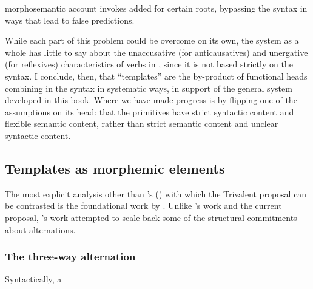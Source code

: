 \begin{exe}
\begin{xlist}
\begin{xlist}
\begin{exe}
\begin{xlist}
\begin{xlist}
\begin{exe}
\begin{xlist}
\begin{xlist}
\begin{exe}
\begin{exe}
\begin{xlist}
\begin{exe}
\begin{exe}
\begin{xlist}
\begin{exe}
\begin{exe}
\begin{exe}
\begin{exe}
\begin{exe}
\begin{xlist}
\begin{exe}
\begin{xlist}
\begin{exe}
\begin{exe}
\begin{xlist}
\begin{exe}
\begin{xlist}
\begin{exe}
\begin{xlist}
\begin{exe}
\begin{exe}
\begin{exe}
\begin{xlist}
\begin{exe}
\begin{exe}
\begin{exe}
\begin{xlist}
\begin{exe}
\begin{xlist}
\begin{exe}
\begin{xlist}
\begin{exe}
\begin{xlist}
\begin{exe}
\begin{exe}
\begin{exe}
\begin{exe}
\begin{xlist}
\begin{exe}
\begin{xlist}
\begin{exe}
\begin{xlist}
\begin{exe}
\begin{xlist}
\begin{exe}
\begin{xlist}
\begin{exe}
\begin{xlist}
\begin{exe}
\begin{exe}
\begin{exe}
\begin{exe}
\begin{xlist}
\begin{exe}
\begin{xlist}
\begin{exe}
\begin{xlist}
\begin{exe}
\begin{exe}
\begin{xlist}
\begin{exe}
\begin{xlist}
\begin{exe}
\begin{exe}
\begin{exe}
\begin{exe}
\begin{xlist}
\begin{xlist}
\begin{exe}
\begin{xlist}
\begin{exe}
\begin{exe}
\begin{exe}
\begin{xlist}
\begin{exe}
\begin{exe}
\begin{xlist}
\begin{exe}
\begin{exe}
\begin{exe}
\begin{xlist}
\begin{xlist}
\begin{exe}
\begin{xlist}
\begin{exe}
\begin{exe}
\begin{exe}
\begin{exe}
\begin{xlist}
\begin{exe}
\begin{xlist}
\begin{exe}
\begin{xlist}
\begin{exe}
\begin{xlist}
\begin{exe}
\begin{exe}
\begin{exe}
\begin{exe}
\begin{exe}
\begin{exe}
\begin{xlist}
\begin{exe}
\begin{xlist}
\begin{exe}
\begin{xlist}
\begin{exe}
\begin{xlist}
\begin{exe}
\begin{xlist}
\begin{exe}
\begin{xlist}
\begin{exe}
\begin{xlist}
\begin{exe}
\begin{xlist}
morphosemantic account invokes added  for certain roots, bypassing the syntax in ways that lead to false predictions.

While each part of this problem could be overcome on its own, the system as a whole has little to say about the unaccusative (for anticausatives) and unergative (for reflexives) characteristics of verbs in {\thit}, since it is not based strictly on the syntax. I conclude, then, that ``templates'' are the by-product of functional heads combining in the syntax in systematic ways, in support of the general system developed in this book. Where we have made progress is by flipping one of the assumptions on its head: that the primitives have strict syntactic content and flexible semantic content, rather than strict semantic content and unclear syntactic content.
	\subsection{Templates as morphemic elements} \label{vz:others:morph}
The most explicit analysis other than \citeauthor{doron03}'s (\citeyear{doron03}) with which the Trivalent proposal can be contrasted is the foundational work by \cite{arad03,arad05}. Unlike \citeauthor{doron03}'s work and the current proposal, \cite{arad05}'s work attempted to scale back some of the structural commitments about alternations.

		\subsubsection{The three-way alternation}
Syntactically, a 
\end{xlist}
\end{exe}
\end{xlist}
\end{exe}
\end{xlist}
\end{exe}
\end{xlist}
\end{exe}
\end{xlist}
\end{exe}
\end{xlist}
\end{exe}
\end{xlist}
\end{exe}
\end{xlist}
\end{exe}
\end{exe}
\end{exe}
\end{exe}
\end{exe}
\end{exe}
\end{xlist}
\end{exe}
\end{xlist}
\end{exe}
\end{xlist}
\end{exe}
\end{xlist}
\end{exe}
\end{exe}
\end{exe}
\end{exe}
\end{xlist}
\end{exe}
\end{xlist}
\end{xlist}
\end{exe}
\end{exe}
\end{exe}
\end{xlist}
\end{exe}
\end{exe}
\end{xlist}
\end{exe}
\end{exe}
\end{exe}
\end{xlist}
\end{exe}
\end{xlist}
\end{xlist}
\end{exe}
\end{exe}
\end{exe}
\end{exe}
\end{xlist}
\end{exe}
\end{xlist}
\end{exe}
\end{exe}
\end{xlist}
\end{exe}
\end{xlist}
\end{exe}
\end{xlist}
\end{exe}
\end{exe}
\end{exe}
\end{exe}
\end{xlist}
\end{exe}
\end{xlist}
\end{exe}
\end{xlist}
\end{exe}
\end{xlist}
\end{exe}
\end{xlist}
\end{exe}
\end{xlist}
\end{exe}
\end{exe}
\end{exe}
\end{exe}
\end{xlist}
\end{exe}
\end{xlist}
\end{exe}
\end{xlist}
\end{exe}
\end{xlist}
\end{exe}
\end{exe}
\end{exe}
\end{xlist}
\end{exe}
\end{exe}
\end{exe}
\end{xlist}
\end{exe}
\end{xlist}
\end{exe}
\end{xlist}
\end{exe}
\end{exe}
\end{xlist}
\end{exe}
\end{xlist}
\end{exe}
\end{exe}
\end{exe}
\end{exe}
\end{exe}
\end{xlist}
\end{exe}
\end{exe}
\end{xlist}
\end{exe}
\end{exe}
\end{xlist}
\end{xlist}
\end{exe}
\end{xlist}
\end{xlist}
\end{exe}
\end{xlist}
\end{xlist}
\end{exe}
